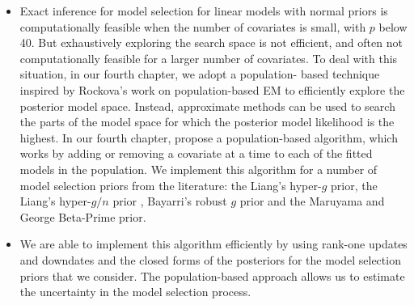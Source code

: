 \begin{itemize}
\item Exact inference for model selection for linear models with normal priors
is computationally feasible when the number of  covariates is small, with $p$
below 40. But exhaustively exploring the search space is not efficient, and
often not computationally feasible for a larger number of covariates. To deal
with this situation, in our fourth chapter, we adopt a population- based
technique inspired by Rockova's work on population-based EM to efficiently
explore the posterior model space. Instead, approximate methods can be used to
search the parts of the model space for which the posterior model likelihood is
the highest. In our fourth chapter, propose a population-based algorithm, which
works by adding or removing a covariate at a time to each of the fitted models
in the population. We implement this algorithm for a number of model selection
priors from the literature: the Liang's hyper-$g$ prior, the Liang's hyper-$g/n$
prior \citep{Liang2008}, Bayarri's robust $g$ prior \citep{Bayarri2012} and the
Maruyama and George Beta-Prime \citep{Maruyama2011} prior.


\item We are able to implement this algorithm efficiently by using rank-one
updates and downdates and the closed forms of the posteriors for the model
selection priors that we consider. The population-based approach allows us to
estimate the uncertainty in the model selection process.

\end{itemize}

